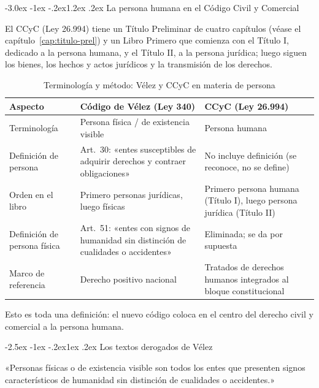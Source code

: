 \documentclass[12pt,oneside]{book}
\makeatletter
\renewcommand\section{\@startsection{section}{1}{\z@}%
  {-3.0ex \@plus -1ex \@minus -.2ex}{1.2ex \@plus .2ex}%
  {\normalfont\large\bfseries\color{acento}}}
\renewcommand\subsection{\@startsection{subsection}{2}{\z@}%
  {-2.5ex \@plus -1ex \@minus -.2ex}{1ex \@plus .2ex}%
  {\normalfont\normalsize\bfseries}}
\makeatother
\begin{document}
\section{La persona humana en el Código Civil y Comercial}

El CCyC (Ley 26.994) tiene un Título Preliminar de cuatro capítulos (véase el capítulo~\ref{cap:titulo-prel}) y un Libro Primero que comienza con el Título I, dedicado a la persona humana, y el Título II, a la persona jurídica; luego siguen los bienes, los hechos y actos jurídicos y la transmisión de los derechos.

\begin{table}[H]
\centering
\begin{tabularx}{\textwidth}{B{0.20\textwidth} Y Y}
\toprule
\textbf{Aspecto} & \textbf{Código de Vélez (Ley 340)} & \textbf{CCyC (Ley 26.994)} \\
\midrule
Terminología & Persona física / de existencia visible & Persona humana \\
Definición de persona & Art.~30: «entes susceptibles de adquirir derechos y contraer obligaciones» & No incluye definición (se reconoce, no se define) \\
Orden en el libro & Primero personas jurídicas, luego físicas & Primero persona humana (Título I), luego persona jurídica (Título II) \\
Definición de persona física & Art.~51: «entes con signos de humanidad sin distinción de cualidades o accidentes» & Eliminada; se da por supuesta \\
Marco de referencia & Derecho positivo nacional & Tratados de derechos humanos integrados al bloque constitucional \\
\bottomrule
\end{tabularx}
\caption{Terminología y método: Vélez y CCyC en materia de persona}
\end{table}

Esto es toda una definición: el nuevo código coloca en el centro del derecho civil y comercial a la persona humana.

\subsection{Los textos derogados de Vélez}

\begin{nota}
«Personas físicas o de existencia visible son todos los entes que presenten signos característicos de humanidad sin distinción de cualidades o accidentes.»
\end{nota}
\end{document}
